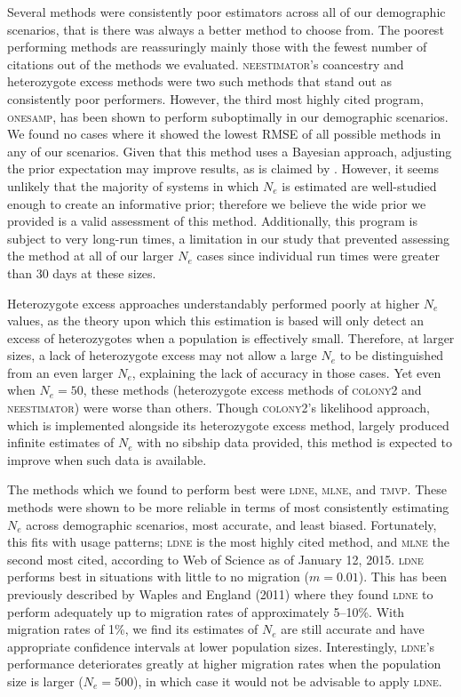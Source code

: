 Several methods were consistently poor estimators across all of our demographic scenarios, that is 
there was always a better method to choose from. The poorest performing methods are reassuringly 
mainly those with the fewest number of citations out of the methods we evaluated. \textsc{neestimator}'s 
coancestry and heterozygote excess methods were two such methods that stand out as consistently poor 
performers. However, the third most highly cited program, \textsc{onesamp}, has been shown to perform 
suboptimally in our demographic scenarios. We found no cases where it showed the lowest RMSE of all 
possible methods in any of our scenarios. Given that this method uses a Bayesian approach, adjusting 
the prior expectation may improve results, as is claimed by \citet{Holleley:2013}. However, it seems 
unlikely that the majority of systems in which $N_e$ is estimated are well-studied enough to 
create an informative prior; therefore we believe the wide prior we provided is a valid assessment of 
this method. Additionally, this program is subject to very long-run times, a limitation in our study 
that prevented assessing the method at all of our larger $N_e$ cases since individual run 
times were greater than 30 days at these sizes.

Heterozygote excess approaches understandably performed poorly at higher $N_e$ values, as 
the theory upon which this estimation is based will only detect an excess of heterozygotes when 
a population is effectively small. Therefore, at larger sizes, a lack of heterozygote excess may 
not allow a large $N_e$ to be distinguished from an even larger $N_e$, explaining 
the lack of accuracy in those cases. Yet even when $N_e = 50$, these methods (heterozygote 
excess methods of \textsc{colony2} and \textsc{neestimator}) were worse than others. Though 
\textsc{colony2}'s likelihood approach, which is implemented alongside its heterozygote excess method, 
largely produced infinite estimates of $N_e$ with no sibship data provided, this method is 
expected to improve when such data is available.

The methods which we found to perform best were \textsc{ldne}, \textsc{mlne}, and \textsc{tmvp}. 
These methods were shown to be more reliable in terms of most consistently estimating $N_e$ 
across demographic scenarios, most accurate, and least biased. Fortunately, this fits with usage 
patterns; \textsc{ldne} is the most highly cited method, and \textsc{mlne} the second most cited, 
according to Web of Science as of January 12, 2015. \textsc{ldne} performs best in situations with 
little to no migration ($m = 0.01$). This has been previously described by Waples and England (2011) 
where they found \textsc{ldne} to perform adequately up to migration rates of approximately 5--10\%. 
With migration rates of 1\%, we find its estimates of $N_e$ are still accurate and have 
appropriate confidence intervals at lower population sizes. Interestingly, \textsc{ldne}'s performance 
deteriorates greatly at higher migration rates when the population size is larger ($N_e = 500$), 
in which case it would not be advisable to apply \textsc{ldne}.

